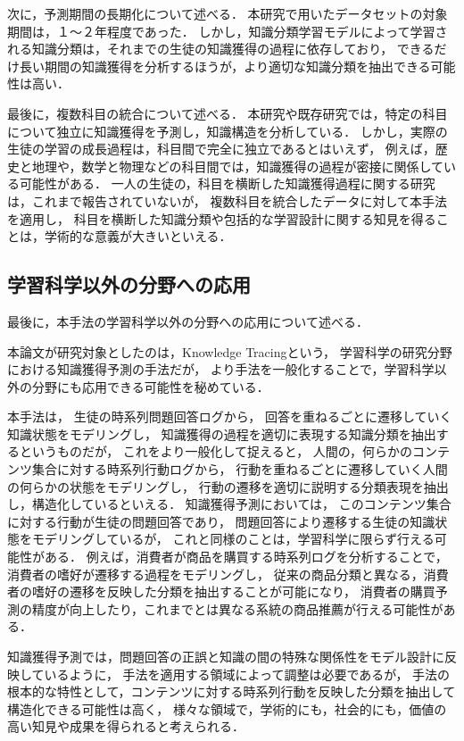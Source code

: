 次に，予測期間の長期化について述べる．
本研究で用いたデータセットの対象期間は，１〜２年程度であった．
しかし，知識分類学習モデルによって学習される知識分類は，それまでの生徒の知識獲得の過程に依存しており，
できるだけ長い期間の知識獲得を分析するほうが，より適切な知識分類を抽出できる可能性は高い．


最後に，複数科目の統合について述べる．
本研究や既存研究では，特定の科目について独立に知識獲得を予測し，知識構造を分析している．
しかし，実際の生徒の学習の成長過程は，科目間で完全に独立であるとはいえず，
例えば，歴史と地理や，数学と物理などの科目間では，知識獲得の過程が密接に関係している可能性がある．
一人の生徒の，科目を横断した知識獲得過程に関する研究は，これまで報告されていないが，
複数科目を統合したデータに対して本手法を適用し，
科目を横断した知識分類や包括的な学習設計に関する知見を得ることは，学術的な意義が大きいといえる．


\subsection{学習科学以外の分野への応用}
最後に，本手法の学習科学以外の分野への応用について述べる．

本論文が研究対象としたのは，Knowledge Tracingという，
学習科学の研究分野における知識獲得予測の手法だが，
より手法を一般化することで，学習科学以外の分野にも応用できる可能性を秘めている．

本手法は，
生徒の時系列問題回答ログから，
回答を重ねるごとに遷移していく知識状態をモデリングし，
知識獲得の過程を適切に表現する知識分類を抽出するというものだが，
これをより一般化して捉えると，
人間の，何らかのコンテンツ集合に対する時系列行動ログから，
行動を重ねるごとに遷移していく人間の何らかの状態をモデリングし，
行動の遷移を適切に説明する分類表現を抽出し，構造化しているといえる．
知識獲得予測においては，
このコンテンツ集合に対する行動が生徒の問題回答であり，
問題回答により遷移する生徒の知識状態をモデリングしているが，
これと同様のことは，学習科学に限らず行える可能性がある．
例えば，消費者が商品を購買する時系列ログを分析することで，
消費者の嗜好が遷移する過程をモデリングし，
従来の商品分類と異なる，消費者の嗜好の遷移を反映した分類を抽出することが可能になり，
消費者の購買予測の精度が向上したり，これまでとは異なる系統の商品推薦が行える可能性がある．

知識獲得予測では，問題回答の正誤と知識の間の特殊な関係性をモデル設計に反映しているように，
手法を適用する領域によって調整は必要であるが，
手法の根本的な特性として，コンテンツに対する時系列行動を反映した分類を抽出して構造化できる可能性は高く，
様々な領域で，学術的にも，社会的にも，価値の高い知見や成果を得られると考えられる．

